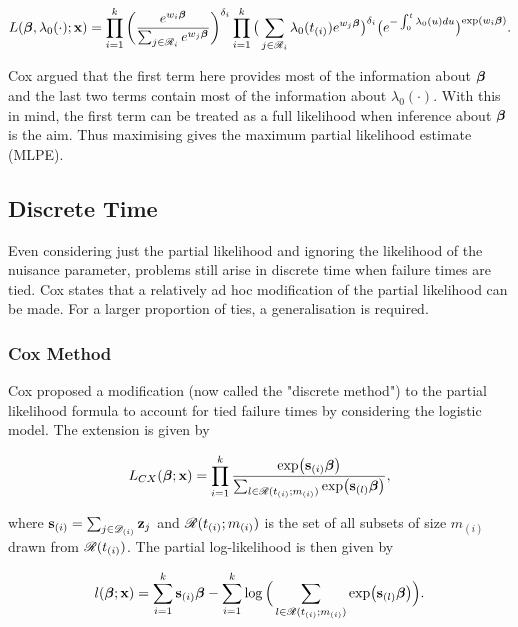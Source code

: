 \begin{equation}
    L(\boldsymbol{\beta},\lambda_0(\cdot);\textbf{x})=\prod_{i=1}^k\bigg(\frac{e^{w_i\boldsymbol{\beta}}}{\sum_{j\in\mathscr{R}_i}e^{w_j\boldsymbol{\beta}}}\bigg)^{\delta_i}\prod_{i=1}^k\big(\sum_{j\in\mathscr{R}_i}\lambda_0(t_{(i)})e^{w_j\boldsymbol{\beta}}\big)^{\delta_i}\big(e^{-\int_0^t\lambda_0(u)du}\big)^{\exp(w_i\boldsymbol{\beta})}.
\end{equation}

Cox  argued that the first term here provides most of the information about $\boldsymbol{\beta}$ and the last two terms contain most of the information about $\lambda_0(\cdot)$. With this in mind, the first term can be treated as a full likelihood when inference about $\boldsymbol{\beta}$ is the aim. Thus maximising  gives the maximum partial likelihood estimate (MLPE).

\subsection{Discrete Time}

Even considering just the partial likelihood and ignoring the likelihood of the nuisance parameter, problems still arise in discrete time when failure times are tied. Cox  states that a relatively ad hoc modification of the partial likelihood can be made. For a larger proportion of ties, a generalisation is required.

\subsubsection{Cox Method}

Cox  proposed a modification (now called the "discrete method") to the partial likelihood formula to account for tied failure times by considering the logistic model. The extension is given by

\begin{equation}
    L_{CX}(\boldsymbol{\beta};\textbf{x})=\prod_{i=1}^k\frac{\exp(\textbf{s}_{(i)}\boldsymbol{\beta})}{\sum_{l\in\mathscr{R}(t_{(i)};m_{(i)})}\exp(\textbf{s}_{(l)}\boldsymbol{\beta})},
\end{equation}

where $\textbf{s}_{(i)}=\sum_{j\in\mathscr{D}_{(i)}}\textbf{z}_j$ and $\mathscr{R}(t_{(i)};m_{(i)})$ is the set of all subsets of size $m_{(i)}$ drawn from $\mathscr{R}(t_{(i)})$. The partial log-likelihood is then given by

\begin{equation}
    l(\boldsymbol{\beta};\textbf{x})=\sum_{i=1}^k\textbf{s}_{(i)}\boldsymbol{\beta}-\sum_{i=1}^k\log\Big(\sum_{l\in\mathscr{R}(t_{(i)};m_{(i)})}\exp(\textbf{s}_{(l)}\boldsymbol{\beta})\Big).
\end{equation}

